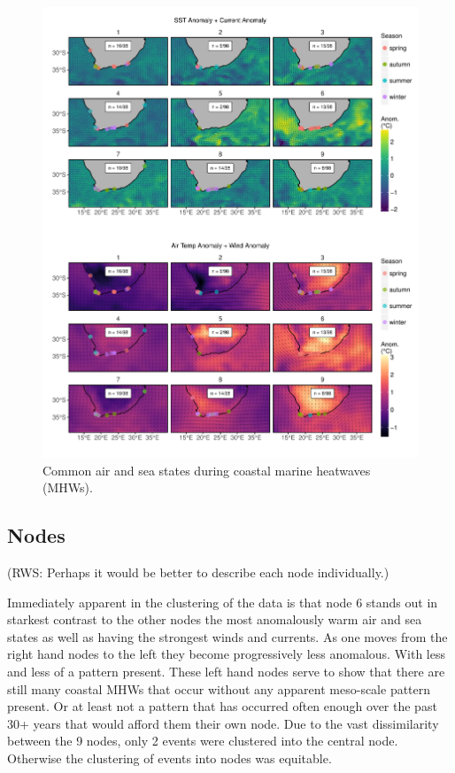 \documentclass[a4paper,10pt,review]{elsarticle}
\begin{document}
\begin{figure}
\includegraphics[width=1.0\textwidth]{figure_4.pdf}
\caption{Common air and sea states during coastal marine heatwaves (MHWs).}
\label{figure4}
\end{figure}

\subsection{Nodes}

(RWS: Perhaps it would be better to describe each node individually.)

Immediately apparent in the clustering of the data is that node 6 stands out in starkest contrast to the other nodes the most anomalously warm air and sea states as well as having the strongest winds and currents. As one moves from the right hand nodes to the left they become progressively less anomalous. With less and less of a pattern present. These left hand nodes serve to show that there are still many coastal MHWs that occur without any apparent meso-scale pattern present. Or at least not a pattern that has occurred often enough over the past 30+ years that would afford them their own node. Due to the vast dissimilarity between the 9 nodes, only 2 events were clustered into the central node. Otherwise the clustering of events into nodes was equitable.
\end{document}

